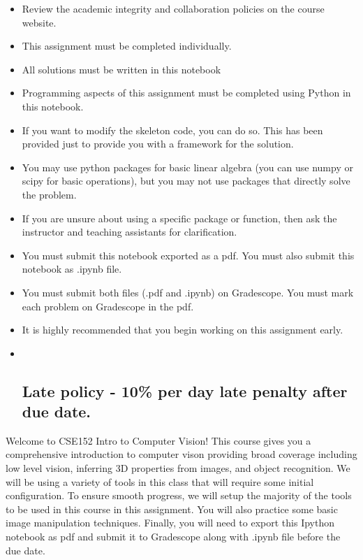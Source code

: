 \documentclass[11pt]{article}
\begin{document}
\begin{itemize}
\item
  Review the academic integrity and collaboration policies on the course
  website.
\item
  This assignment must be completed individually.
\item
  All solutions must be written in this notebook
\item
  Programming aspects of this assignment must be completed using Python
  in this notebook.
\item
  If you want to modify the skeleton code, you can do so. This has been
  provided just to provide you with a framework for the solution.
\item
  You may use python packages for basic linear algebra (you can use
  numpy or scipy for basic operations), but you may not use packages
  that directly solve the problem.
\item
  If you are unsure about using a specific package or function, then ask
  the instructor and teaching assistants for clarification.
\item
  You must submit this notebook exported as a pdf. You must also submit
  this notebook as .ipynb file.
\item
  You must submit both files (.pdf and .ipynb) on Gradescope. You must
  mark each problem on Gradescope in the pdf.
\item
  It is highly recommended that you begin working on this assignment
  early.
\item ~
  \subsection{\texorpdfstring{\textbf{Late policy} - 10\% per day late
  penalty after due
  date.}{Late policy - 10\% per day late penalty after due date.}}\label{late-policy---10-per-day-late-penalty-after-due-date.}
\end{itemize}

Welcome to CSE152 Intro to Computer Vision! This course gives you a
comprehensive introduction to computer vison providing broad coverage
including low level vision, inferring 3D properties from images, and
object recognition. We will be using a variety of tools in this class
that will require some initial configuration. To ensure smooth progress,
we will setup the majority of the tools to be used in this course in
this assignment. You will also practice some basic image manipulation
techniques. Finally, you will need to export this Ipython notebook as
pdf and submit it to Gradescope along with .ipynb file before the due
date.
\end{document}
